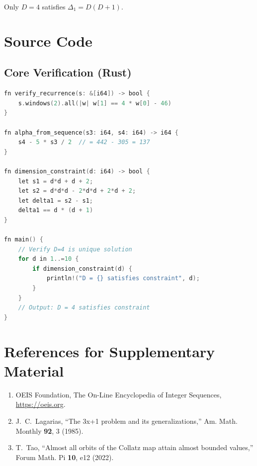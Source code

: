 \documentclass[12pt,a4paper]{article}
\begin{document}
Only $D = 4$ satisfies $\Delta_1 = D(D+1)$.

\section{Source Code}

\subsection{Core Verification (Rust)}

\begin{lstlisting}[language=C]
fn verify_recurrence(s: &[i64]) -> bool {
    s.windows(2).all(|w| w[1] == 4 * w[0] - 46)
}

fn alpha_from_sequence(s3: i64, s4: i64) -> i64 {
    s4 - 5 * s3 / 2  // = 442 - 305 = 137
}

fn dimension_constraint(d: i64) -> bool {
    let s1 = d*d + d + 2;
    let s2 = d*d*d - 2*d*d + 2*d + 2;
    let delta1 = s2 - s1;
    delta1 == d * (d + 1)
}

fn main() {
    // Verify D=4 is unique solution
    for d in 1..=10 {
        if dimension_constraint(d) {
            println!("D = {} satisfies constraint", d);
        }
    }
    // Output: D = 4 satisfies constraint
}
\end{lstlisting}

\section{References for Supplementary Material}

\begin{enumerate}
\item OEIS Foundation, The On-Line Encyclopedia of Integer Sequences, 
\url{https://oeis.org}.

\item J.~C.~Lagarias, ``The 3x+1 problem and its generalizations,'' 
Am. Math. Monthly \textbf{92}, 3 (1985).

\item T.~Tao, ``Almost all orbits of the Collatz map attain almost bounded values,'' 
Forum Math. Pi \textbf{10}, e12 (2022).
\end{enumerate}
\end{document}
